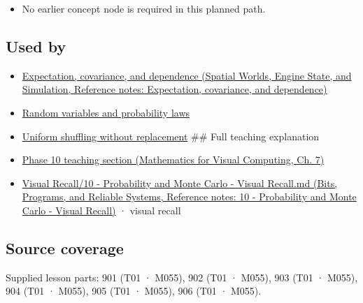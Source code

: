\begin{itemize}
\tightlist
\item
  No earlier concept node is required in this planned path.
\end{itemize}

\subsection{Used by}\label{appendix-f1ef323f6ed7-used-by}

\hypertarget{appendix-f1ef323f6ed7-used-by}{}

\begin{itemize}
\item
  \href{../05-Spatial-Worlds-Engine-State-and-Simulation/main.pdf\#nameddest=appendix-54c383df9992}{Expectation, covariance, and dependence (Spatial Worlds, Engine State, and Simulation, Reference notes: Expectation, covariance, and dependence)}
\item
  \hyperref[appendix-4d0203f7944f]{Random variables and probability laws}
\item
  \hyperref[appendix-184fcc411663]{Uniform shuffling without replacement} \#\# Full teaching explanation
\item
  \href{../02-Mathematics-for-Visual-Computing/main.pdf\#nameddest=02-foundations-ii-ch023-a-probability-model-begins-with-possible-outcomes}{Phase 10 teaching section (Mathematics for Visual Computing, Ch. 7)}
\item
  \href{../01-Bits-Programs-and-Reliable-Systems/main.pdf\#nameddest=appendix-cb5af353ef77}{Visual Recall/10 - Probability and Monte Carlo - Visual Recall.md (Bits, Programs, and Reliable Systems, Reference notes: 10 - Probability and Monte Carlo - Visual Recall)} · visual recall
\end{itemize}

\subsection{Source coverage}\label{appendix-f1ef323f6ed7-source-coverage}

\hypertarget{appendix-f1ef323f6ed7-source-coverage}{}

Supplied lesson parts: 901 (T01 · M055), 902 (T01 · M055), 903 (T01 · M055), 904 (T01 · M055), 905 (T01 · M055), 906 (T01 · M055).

